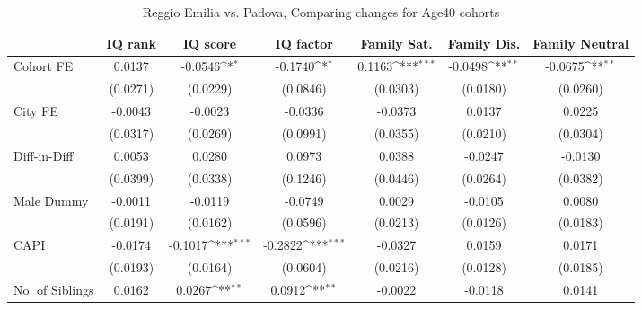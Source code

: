 \begin{table}[htbp]\centering
\def\sym#1{\ifmmode^{#1}\else\(^{#1}\)\fi}
\caption{Reggio Emilia vs. Padova, Comparing changes for Age40 cohorts}
\begin{tabular}{l*{6}{c}}
\toprule
            &\multicolumn{1}{c}{IQ rank}&\multicolumn{1}{c}{IQ score}&\multicolumn{1}{c}{IQ factor}&\multicolumn{1}{c}{Family Sat.}&\multicolumn{1}{c}{Family Dis.}&\multicolumn{1}{c}{Family Neutral}\\
\midrule
Cohort FE   &      0.0137         &     -0.0546\sym{*}  &     -0.1740\sym{*}  &      0.1163\sym{***}&     -0.0498\sym{**} &     -0.0675\sym{**} \\
            &    (0.0271)         &    (0.0229)         &    (0.0846)         &    (0.0303)         &    (0.0180)         &    (0.0260)         \\
\addlinespace
City FE     &     -0.0043         &     -0.0023         &     -0.0336         &     -0.0373         &      0.0137         &      0.0225         \\
            &    (0.0317)         &    (0.0269)         &    (0.0991)         &    (0.0355)         &    (0.0210)         &    (0.0304)         \\
\addlinespace
Diff-in-Diff&      0.0053         &      0.0280         &      0.0973         &      0.0388         &     -0.0247         &     -0.0130         \\
            &    (0.0399)         &    (0.0338)         &    (0.1246)         &    (0.0446)         &    (0.0264)         &    (0.0382)         \\
\addlinespace
Male Dummy  &     -0.0011         &     -0.0119         &     -0.0749         &      0.0029         &     -0.0105         &      0.0080         \\
            &    (0.0191)         &    (0.0162)         &    (0.0596)         &    (0.0213)         &    (0.0126)         &    (0.0183)         \\
\addlinespace
CAPI        &     -0.0174         &     -0.1017\sym{***}&     -0.2822\sym{***}&     -0.0327         &      0.0159         &      0.0171         \\
            &    (0.0193)         &    (0.0164)         &    (0.0604)         &    (0.0216)         &    (0.0128)         &    (0.0185)         \\
\addlinespace
No. of Siblings&      0.0162         &      0.0267\sym{**} &      0.0912\sym{**} &     -0.0022         &     -0.0118         &      0.0141         \\

\end{tabular}
\end{table}
